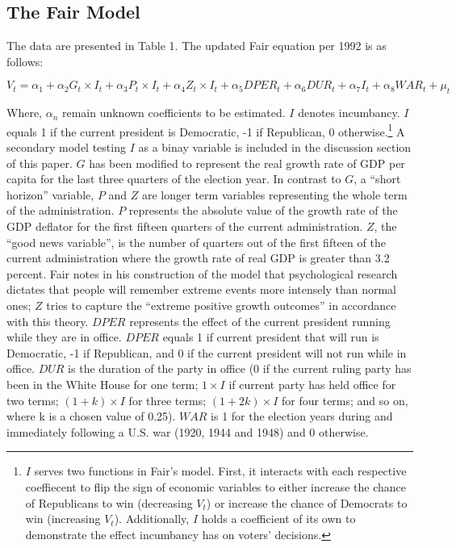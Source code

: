 \documentclass[11,]{article}
\let\rmarkdownfootnote\footnote%
\def\footnote{\protect\rmarkdownfootnote}
\begin{document}
\hypertarget{the-fair-model}{%
\subsection{The Fair Model}\label{the-fair-model}}

The data are presented in Table 1. The updated Fair equation per 1992 is
as follows:

\[ V_t = \alpha_1 + \alpha_2 G_t\times I_t + \alpha_3 P_t\times I_t + \alpha_4 Z_t\times I_t + \alpha_5 {DPER_t} + \alpha_6 {DUR_t} +\alpha_7 I_t + \alpha_8 {WAR_t} + \mu_t \]

Where, \(\alpha_n\) remain unknown coefficients to be estimated. \(I\)
denotes incumbancy. \(I\) equals 1 if the current president is
Democratic, -1 if Republican, 0 otherwise.\footnote{\(I\) serves two
  functions in Fair's model. First, it interacts with each respective
  coeffiecent to flip the sign of economic variables to either increase
  the chance of Republicans to win (decreasing \(V_t\)) or increase the
  chance of Democrats to win (increasing \(V_t\)). Additionally, \(I\)
  holds a coefficient of its own to demonstrate the effect incumbancy
  has on voters' decisions.} A secondary model testing \(I\) as a binay
variable is included in the discussion section of this paper. \(G\) has
been modified to represent the real growth rate of GDP per capita for
the last three quarters of the election year. In contrast to \(G\), a
``short horizon'' variable, \(P\) and \(Z\) are longer term variables
representing the whole term of the administration. \(P\) represents the
absolute value of the growth rate of the GDP deflator for the first
fifteen quarters of the current administration. \(Z\), the ``good news
variable'', is the number of quarters out of the first fifteen of the
current administration where the growth rate of real GDP is greater than
3.2 percent. Fair notes in his construction of the model that
psychological research dictates that people will remember extreme events
more intensely than normal ones; \(Z\) tries to capture the ``extreme
positive growth outcomes'' in accordance with this theory. \(DPER\)
represents the effect of the current president running while they are in
office. \(DPER\) equals 1 if current president that will run is
Democratic, -1 if Republican, and 0 if the current president will not
run while in office. \(DUR\) is the duration of the party in office (0
if the current ruling party has been in the White House for one term;
\(1\times I\) if current party has held office for two terms;
\((1+k) \times I\) for three terms; \((1+2k)\times I\) for four terms;
and so on, where k is a chosen value of 0.25). \(WAR\) is 1 for the
election years during and immediately following a U.S. war (1920, 1944
and 1948) and 0 otherwise.
\end{document}

